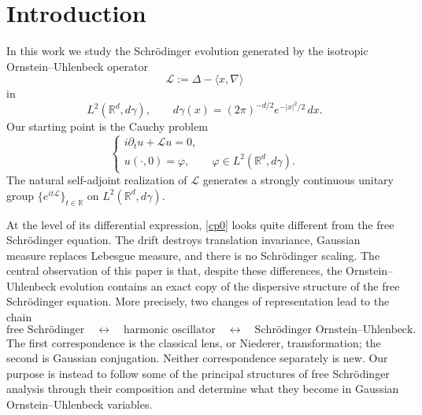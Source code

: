\documentclass[11pt,a4paper]{amsart}
\def \R {\mathbb{R}}
\def \vf{\varphi}
\numberwithin{equation}{section}
\numberwithin{equation}{section}
\begin{document}
\author{Nicola Garofalo}

\address{School of Mathematical and Statistical Sciences\\ Arizona State University\\ Tempe, AZ 85287-1804}
\vskip 0.2in



\maketitle

\tableofcontents




\section{Introduction}\label{S:intro}

In this work we study the Schr\"odinger evolution generated by the
isotropic Ornstein--Uhlenbeck operator
\[
\mathscr L:=\Delta-\langle x,\nabla\rangle
\]
in
\[
L^2(\R^d,d\gamma),
\qquad
d\gamma(x)=(2\pi)^{-d/2}e^{-|x|^2/2}\,dx.
\]
Our starting point is the Cauchy problem
\begin{equation}\label{cp0}
\begin{cases}
i\partial_tu+\mathscr Lu=0,\\
u(\cdot,0)=\vf,\qquad \vf\in L^2(\R^d,d\gamma).
\end{cases}
\end{equation}
The natural self-adjoint realization of $\mathscr L$ generates a
strongly continuous unitary group
$\{e^{it\mathscr L}\}_{t\in\R}$ on $L^2(\R^d,d\gamma)$.

At the level of its differential expression, \eqref{cp0} looks quite
different from the free Schr\"odinger equation.  The drift destroys
translation invariance, Gaussian measure replaces Lebesgue measure,
and there is no Schr\"odinger scaling.  The central observation of
this paper is that, despite these differences, the Ornstein--Uhlenbeck
evolution contains an exact copy of the dispersive structure of the
free Schr\"odinger equation.  More precisely, two changes of
representation lead to the chain
\medskip
\[
\boxed{
\text{free Schr\"odinger}
\quad\longleftrightarrow\quad
\text{harmonic oscillator}
\quad\longleftrightarrow\quad
\text{Schr\"odinger Ornstein--Uhlenbeck}.
}
\]
\medskip
The first correspondence is the classical lens, or Niederer,
transformation; the second is Gaussian conjugation.  Neither
correspondence separately is new.  Our purpose is instead to follow
some of the principal structures of free Schr\"odinger analysis
through their composition and determine what they become in Gaussian
Ornstein--Uhlenbeck variables.
\end{document}
